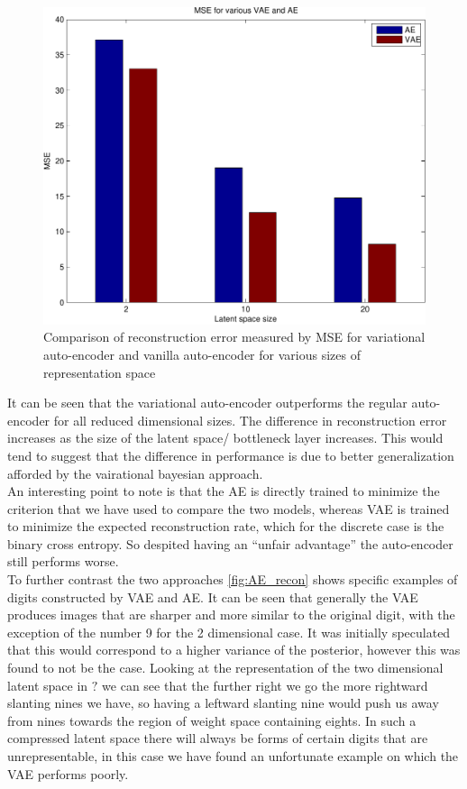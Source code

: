 \documentclass[../report.tex]{subfiles}
\begin{document}
\begin{figure}[hbt]
\centering
\hspace{0em}
\includegraphics[width=0.4\columnwidth]{../../res/mnist_mse.pdf}
\caption{Comparison of reconstruction error measured by MSE for variational auto-encoder and vanilla auto-encoder for various sizes of representation space}
\label{fig:AE_MSE}
\end{figure}

It can be seen that the variational auto-encoder outperforms the regular auto-encoder for all reduced dimensional sizes. The difference in reconstruction error increases as the size of the latent space/ bottleneck layer increases. This would tend to suggest that the difference in performance is due to better generalization afforded by the vairational bayesian approach.\\ An interesting point to note is that the AE is directly trained to minimize the criterion that we have used to compare the two models, whereas VAE is trained to minimize the expected reconstruction rate, which for the discrete case is the binary cross entropy. So despited having an ``unfair advantage'' the auto-encoder still performs worse.\\
To further contrast the two approaches \cref{fig:AE_recon} shows specific examples of digits constructed by VAE and AE. It can be seen that generally the VAE produces images that are sharper and more similar to the original digit, with the exception of the number 9 for the 2 dimensional case. It was initially speculated that this would correspond to a higher variance of the posterior, however this was found to not be the case. Looking at the representation of the two dimensional latent space in $?$ we can see that the further right we go the more rightward slanting nines we have, so having a leftward slanting nine would push us away from nines towards the region of weight space containing eights. In such a compressed latent space there will always be forms of certain digits that are unrepresentable, in this case we have found an unfortunate example on which the VAE performs poorly.\\
\end{document}
